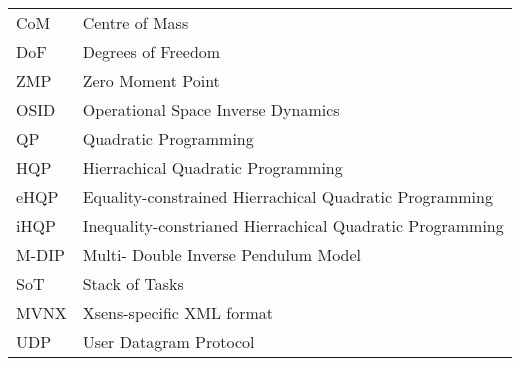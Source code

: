 \documentclass{thesisreport}
\begin{document}
\begin{tabular}{p{3cm}p{15cm}}
CoM & Centre of Mass \\
DoF & Degrees of Freedom \\
ZMP & Zero Moment Point \\
OSID & Operational Space Inverse Dynamics \\
QP & Quadratic Programming \\
HQP & Hierrachical Quadratic Programming \\
eHQP & Equality-constrained Hierrachical Quadratic Programming \\
iHQP & Inequality-constrianed Hierrachical Quadratic Programming \\
M-DIP & Multi- Double Inverse Pendulum Model \\
SoT & Stack of Tasks \\
MVNX & Xsens-specific XML format \\
UDP & User Datagram Protocol \\



\end{tabular}

 \newpage
 
 \tableofcontents

 \listoffigures
 
\listoftables
 

 
 






 
 
 
 \appendix	
 
 
 
 
 
 
 
 
\end{document}
